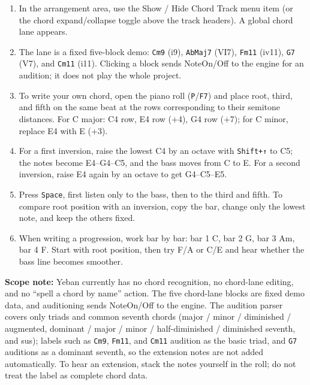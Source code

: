 \begin{enumerate}
  \item In the arrangement area, use the Show / Hide Chord Track menu item (or the chord expand/collapse toggle above the track headers). A global chord lane appears.
  \item The lane is a fixed five-block demo: \texttt{Cm9} (i9), \texttt{AbMaj7} (VI7), \texttt{Fm11} (iv11), \texttt{G7} (V7), and \texttt{Cm11} (i11). Clicking a block sends NoteOn/Off to the engine for an audition; it does not play the whole project.
  \item To write your own chord, open the piano roll (\texttt{P}/\texttt{F7}) and place root, third, and fifth on the same beat at the rows corresponding to their semitone distances. For C major: C4 row, E4 row (+4), G4 row (+7); for C minor, replace E4 with E (+3).
  \item For a first inversion, raise the lowest C4 by an octave with \texttt{Shift+↑} to C5; the notes become E4--G4--C5, and the bass moves from C to E. For a second inversion, raise E4 again by an octave to get G4--C5--E5.
  \item Press \texttt{Space}, first listen only to the bass, then to the third and fifth. To compare root position with an inversion, copy the bar, change only the lowest note, and keep the others fixed.
  \item When writing a progression, work bar by bar: bar 1 C, bar 2 G, bar 3 Am, bar 4 F. Start with root position, then try F/A or C/E and hear whether the bass line becomes smoother.
\end{enumerate}


\textbf{Scope note:} Yeban currently has no chord recognition, no chord-lane editing, and no ``spell a chord by name'' action. The five chord-lane blocks are fixed demo data, and auditioning sends NoteOn/Off to the engine. The audition parser covers only triads and common seventh chords (major / minor / diminished / augmented, dominant / major / minor / half-diminished / diminished seventh, and sus); labels such as \texttt{Cm9}, \texttt{Fm11}, and \texttt{Cm11} audition as the basic triad, and \texttt{G7} auditions as a dominant seventh, so the extension notes are not added automatically. To hear an extension, stack the notes yourself in the roll; do not treat the label as complete chord data.

